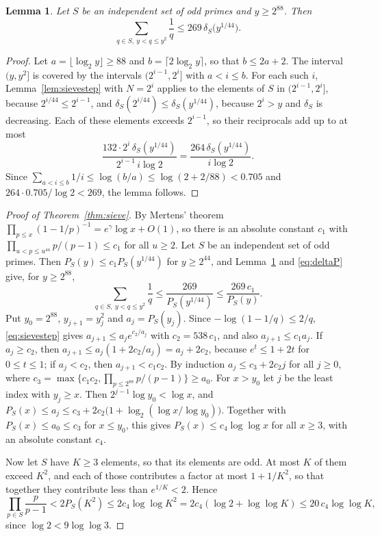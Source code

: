 \documentclass[11pt,reqno]{amsart}
\numberwithin{equation}{section}
\theoremstyle{plain}
\newtheorem{lemma}[theorem]{Lemma}
\theoremstyle{definition}
\theoremstyle{remark}
\begin{document}
\begin{lemma}\label{lem:sievesum}
Let $S$ be an independent set of odd primes and $y\ge2^{88}$. Then
\[
  \sum_{q\in S,\ y<q\le y^2}\frac1q\le269\,\delta_S\bigl(y^{1/44}\bigr).
\]
\end{lemma}

\begin{proof}
Let $a=\lfloor\log_2y\rfloor\ge88$ and $b=\lceil2\log_2y\rceil$, so
that $b\le2a+2$. The interval $(y,y^2]$ is covered by the intervals
$(2^{i-1},2^i]$ with $a<i\le b$. For each such $i$,
Lemma~\ref{lem:sievestep} with $N=2^i$ applies to the elements of $S$
in $(2^{i-1},2^i]$, because $2^{i/44}\le2^{i-1}$, and
$\delta_S(2^{i/44})\le\delta_S(y^{1/44})$, because $2^i>y$ and
$\delta_S$ is decreasing. Each of these elements exceeds $2^{i-1}$, so
their reciprocals add up to at most
\[
  \frac{132\cdot2^i\,\delta_S(y^{1/44})}{2^{i-1}\,i\log2}
  =\frac{264\,\delta_S(y^{1/44})}{i\log2}.
\]
Since $\sum_{a<i\le b}1/i\le\log(b/a)\le\log(2+2/88)<0.705$ and
$264\cdot0.705/\log2<269$, the lemma follows.
\end{proof}

\begin{proof}[Proof of Theorem~\ref{thm:sieve}]
By Mertens' theorem $\prod_{p\le x}(1-1/p)^{-1}=e^{\gamma}\log x+O(1)$,
so there is an absolute constant $c_1$ with
$\prod_{u<p\le u^{44}}p/(p-1)\le c_1$ for all $u\ge2$. Let $S$ be an
independent set of odd primes. Then $P_S(y)\le c_1P_S(y^{1/44})$ for
$y\ge2^{44}$, and
Lemma~\ref{lem:sievesum} and \eqref{eq:deltaP} give, for $y\ge2^{88}$,
\begin{equation}\label{eq:sievestep}
  \sum_{q\in S,\ y<q\le y^2}\frac1q\le\frac{269}{P_S(y^{1/44})}
  \le\frac{269\,c_1}{P_S(y)} .
\end{equation}
Put $y_0=2^{88}$, $y_{j+1}=y_j^2$ and $a_j=P_S(y_j)$. Since
$-\log(1-1/q)\le2/q$, \eqref{eq:sievestep} gives
$a_{j+1}\le a_je^{c_2/a_j}$ with $c_2=538\,c_1$, and also
$a_{j+1}\le c_1a_j$. If $a_j\ge c_2$, then
$a_{j+1}\le a_j(1+2c_2/a_j)=a_j+2c_2$, because $e^t\le1+2t$ for
$0\le t\le1$; if $a_j<c_2$, then $a_{j+1}<c_1c_2$. By induction
$a_j\le c_3+2c_2j$ for all $j\ge0$, where
$c_3=\max\bigl\{c_1c_2,\prod_{p\le2^{88}}p/(p-1)\bigr\}\ge a_0$. For $x>y_0$
let $j$ be the least index with $y_j\ge x$. Then
$2^{j-1}\log y_0<\log x$, and
$P_S(x)\le a_j\le c_3+2c_2\bigl(1+\log_2(\log x/\log y_0)\bigr)$.
Together with $P_S(x)\le a_0\le c_3$ for $x\le y_0$, this gives
$P_S(x)\le c_4\log\log x$ for all $x\ge3$, with an absolute constant
$c_4$.

Now let $S$ have $K\ge3$ elements, so that its elements are odd. At
most $K$ of them exceed $K^2$, and each of those contributes a factor
at most $1+1/K^2$, so that together they contribute less than
$e^{1/K}<2$. Hence
\[
  \prod_{p\in S}\frac p{p-1}<2P_S(K^2)\le2c_4\log\log K^2
  =2c_4(\log2+\log\log K)\le20\,c_4\log\log K,
\]
since $\log2<9\log\log3$.
\end{proof}
\end{document}
